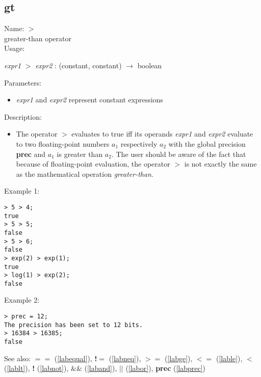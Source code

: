 \subsection{gt}
\label{labgt}
\noindent Name: \textbf{$>$}\\
greater-than operator\\

\noindent Usage: 
\begin{center}
\emph{expr1} \textbf{$>$} \emph{expr2} : (\textsf{constant}, \textsf{constant}) $\rightarrow$ \textsf{boolean}\\
\end{center}
Parameters: 
\begin{itemize}
\item \emph{expr1} and \emph{expr2} represent constant expressions
\end{itemize}
\noindent Description: \begin{itemize}

\item The operator \textbf{$>$} evaluates to true iff its operands \emph{expr1} and
   \emph{expr2} evaluate to two floating-point numbers $a_1$
   respectively $a_2$ with the global precision \textbf{prec} and
   $a_1$ is greater than $a_2$. The user should
   be aware of the fact that because of floating-point evaluation, the
   operator \textbf{$>$} is not exactly the same as the mathematical
   operation \emph{greater-than}.
\end{itemize}
\noindent Example 1: 
\begin{center}\begin{minipage}{15cm}\begin{Verbatim}[frame=single]
> 5 > 4;
true
> 5 > 5;
false
> 5 > 6;
false
> exp(2) > exp(1);
true
> log(1) > exp(2);
false
\end{Verbatim}
\end{minipage}\end{center}
\noindent Example 2: 
\begin{center}\begin{minipage}{15cm}\begin{Verbatim}[frame=single]
> prec = 12;
The precision has been set to 12 bits.
> 16384 > 16385;
false
\end{Verbatim}
\end{minipage}\end{center}
See also: \textbf{$==$} (\ref{labequal}), \textbf{!$=$} (\ref{labneq}), \textbf{$>=$} (\ref{labge}), \textbf{$<=$} (\ref{lable}), \textbf{$<$} (\ref{lablt}), \textbf{!} (\ref{labnot}), \textbf{$\&\&$} (\ref{laband}), \textbf{$||$} (\ref{labor}), \textbf{prec} (\ref{labprec})
